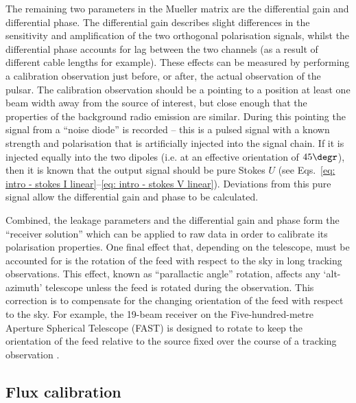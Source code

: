 The remaining two parameters in the Mueller matrix are the differential gain and differential phase. The differential gain describes slight differences in the sensitivity and amplification of the two orthogonal polarisation signals, whilst the differential phase accounts for lag between the two channels (as a result of different cable lengths for example). These effects can be measured by performing a calibration observation just before, or after, the actual observation of the pulsar. The calibration observation should be a pointing to a position at least one beam width away from the source of interest, but close enough that the properties of the background radio emission are similar. During this pointing the signal from a ``noise diode'' is recorded -- this is a pulsed signal with a known strength and polarisation that is artificially injected into the signal chain. If it is injected equally into the two dipoles (i.e. at an effective orientation of $45\degr$), then it is known that the output signal should be pure Stokes $U$ (see Eqs.~\eqref{eq: intro - stokes I linear}--\eqref{eq: intro - stokes V linear}). Deviations from this pure signal allow the differential gain and phase to be calculated. 

Combined, the leakage parameters and the differential gain and phase form the ``receiver solution'' which can be applied to raw data in order to calibrate its polarisation properties. One final effect that, depending on the telescope, must be accounted for is the rotation of the feed with respect to the sky in long tracking observations. This effect, known as ``parallactic angle'' rotation, affects any `alt-azimuth' telescope unless the feed is rotated during the observation. This correction is to compensate for the changing orientation of the feed with respect to the sky. For example, the 19-beam receiver on the Five-hundred-metre Aperture Spherical Telescope (FAST) is designed to rotate to keep the orientation of the feed relative to the source fixed over the course of a tracking observation \citep[e.g.][]{JYG+2019}.


\subsection{Flux calibration}
\label{sec: intro - observation processing - flux calibration}

